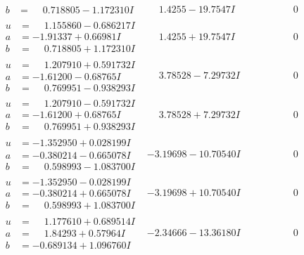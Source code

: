 \documentclass[1p]{elsarticle_modified}
\theoremstyle{definition}
\begin{document}
$$\begin{array}{c|c|c}
\begin{aligned}
b &= \phantom{-}0.718805 - 1.172310 I\end{aligned}
 & \phantom{-}1.4255 - 19.7547 I & \phantom{-0.000000 } 0 \\ \hline\begin{aligned}
u &= \phantom{-}1.155860 - 0.686217 I \\
a &= -1.91337 + 0.66981 I \\
b &= \phantom{-}0.718805 + 1.172310 I\end{aligned}
 & \phantom{-}1.4255 + 19.7547 I & \phantom{-0.000000 } 0 \\ \hline\begin{aligned}
u &= \phantom{-}1.207910 + 0.591732 I \\
a &= -1.61200 - 0.68765 I \\
b &= \phantom{-}0.769951 - 0.938293 I\end{aligned}
 & \phantom{-}3.78528 - 7.29732 I & \phantom{-0.000000 } 0 \\ \hline\begin{aligned}
u &= \phantom{-}1.207910 - 0.591732 I \\
a &= -1.61200 + 0.68765 I \\
b &= \phantom{-}0.769951 + 0.938293 I\end{aligned}
 & \phantom{-}3.78528 + 7.29732 I & \phantom{-0.000000 } 0 \\ \hline\begin{aligned}
u &= -1.352950 + 0.028199 I \\
a &= -0.380214 - 0.665078 I \\
b &= \phantom{-}0.598993 - 1.083700 I\end{aligned}
 & -3.19698 - 10.70540 I & \phantom{-0.000000 } 0 \\ \hline\begin{aligned}
u &= -1.352950 - 0.028199 I \\
a &= -0.380214 + 0.665078 I \\
b &= \phantom{-}0.598993 + 1.083700 I\end{aligned}
 & -3.19698 + 10.70540 I & \phantom{-0.000000 } 0 \\ \hline\begin{aligned}
u &= \phantom{-}1.177610 + 0.689514 I \\
a &= \phantom{-}1.84293 + 0.57964 I \\
b &= -0.689134 + 1.096760 I\end{aligned}
 & -2.34666 - 13.36180 I & \phantom{-0.000000 } 0 \\ \hline\begin{aligned}

\end{aligned}
\end{array}$$
\end{document}
